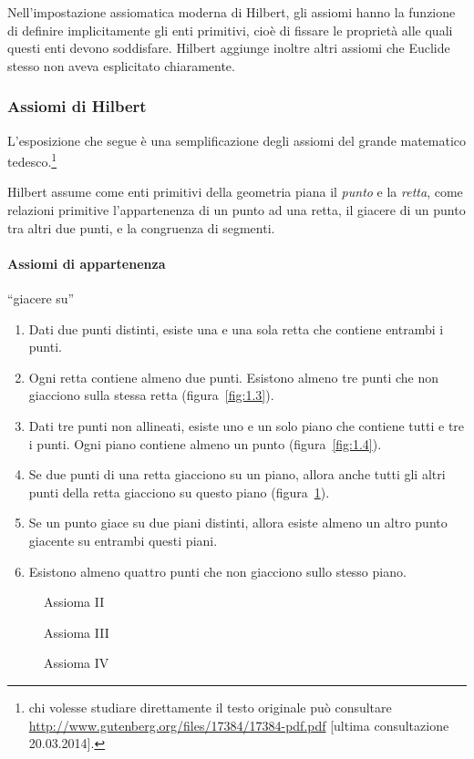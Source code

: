 Nell'impostazione assiomatica moderna di Hilbert, gli assiomi hanno la funzione di definire implicitamente gli enti primitivi, cioè di fissare le proprietà alle quali questi enti devono soddisfare. Hilbert aggiunge inoltre altri assiomi che Euclide stesso non aveva esplicitato chiaramente.

\subsubsection*{Assiomi di Hilbert}\label{sect:ass_Hilbert}

L'esposizione che segue è una semplificazione degli assiomi del grande matematico tedesco.\footnote{chi volesse studiare direttamente il testo originale può consultare \url{http://www.gutenberg.org/files/17384/17384-pdf.pdf} [ultima consultazione 20.03.2014].}

Hilbert assume come enti primitivi della geometria piana il \emph{punto} e la \emph{retta}, come relazioni primitive l'appartenenza di un punto ad una retta, il giacere di un punto tra altri due punti, e la congruenza di segmenti.

\paragraph{Assiomi di appartenenza} ``giacere su''
\begin{enumerate}[label=\Roman{*}.]
\item Dati due punti distinti, esiste una e una sola retta che contiene entrambi i punti.
\item Ogni retta contiene almeno due punti. Esistono almeno tre punti che non giacciono sulla stessa retta (figura~\ref{fig:1.3}).
\item Dati tre punti non allineati, esiste uno e un solo piano che contiene tutti e tre i punti. Ogni piano contiene almeno un punto (figura~\ref{fig:1.4}).
\item Se due punti di una retta giacciono su un piano, allora anche tutti gli altri punti della retta giacciono su questo piano (figura~\ref{fig:1.5}).
\item Se un punto giace su due piani distinti, allora esiste almeno un altro punto giacente su entrambi questi piani.
\item Esistono almeno quattro punti che non giacciono sullo stesso piano.
\end{enumerate}

\begin{figure}[b,t,h]
 \begin{minipage}[b]{.32\textwidth}
 \centering
 
 \caption{Assioma II}\label{fig:1.3}
 \end{minipage}
 \begin{minipage}[b]{.32\textwidth}
 \centering
 
 \caption{Assioma III}\label{fig:1.4}
 \end{minipage}
 \begin{minipage}[b]{.32\textwidth}
 \centering
 
 \caption{Assioma IV}\label{fig:1.5}
 \end{minipage}
\end{figure}

